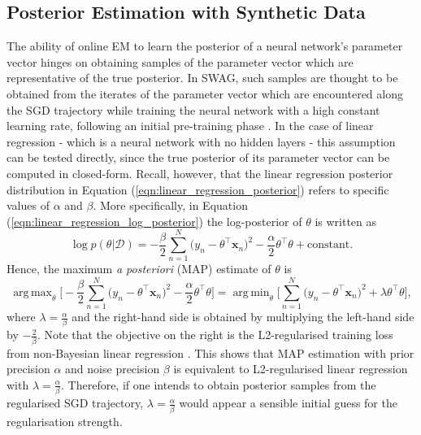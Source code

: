 \documentclass[msc,deptreport.inf]{infthesis} %
\newcommand{\matr}[1]{\mathbf{#1}}
\DeclareMathOperator*{\argmax}{arg\,max}
\DeclareMathOperator*{\argmin}{arg\,min}
\begin{document}
\subsection{Posterior Estimation with Synthetic Data}\label{sec:online_fa_posterior_experiments}

The ability of online EM to learn the posterior of a neural network's parameter vector hinges on obtaining samples of the parameter vector which are representative of the true posterior. In SWAG, such samples are thought to be obtained from the iterates of the parameter vector which are encountered along the SGD trajectory while training the neural network with a high constant learning rate, following an initial pre-training phase \cite{maddox2019}. In the case of linear regression - which is a neural network with no hidden layers - this assumption can be tested directly, since the true posterior of its parameter vector can be computed in closed-form. Recall, however, that the linear regression posterior distribution in Equation (\ref{eqn:linear_regression_posterior}) refers to specific values of $\alpha$ and $\beta$. More specifically, in Equation (\ref{eqn:linear_regression_log_posterior}) the log-posterior of $\theta$ is written as 
\begin{equation}
	\log p(\theta | \mathcal{D}) 
	= -\frac{\beta}{2} \sum_{n=1}^N \big(y_n - \theta^\intercal \matr{x}_n \big)^2 
	-\frac{\alpha}{2} \theta^\intercal \theta 
	+ \text{constant}.
\end{equation}
Hence, the maximum \emph{a posteriori} (MAP) estimate of $\theta$ is 
\begin{equation}
	\argmax_\theta \Big[ -\frac{\beta}{2} \sum_{n=1}^N \big(y_n - \theta^\intercal \matr{x}_n \big)^2 
	-\frac{\alpha}{2} \theta^\intercal \theta \Big]
	= \argmin_\theta \Big[ \sum_{n=1}^N \big(y_n - \theta^\intercal \matr{x}_n \big)^2 
	+ \lambda \theta^\intercal \theta \Big],
\end{equation}
where $\lambda = \frac{\alpha}{\beta}$ and the right-hand side is obtained by multiplying the left-hand side by $-\frac{2}{\beta}$. Note that the objective on the right is the L2-regularised training loss from non-Bayesian linear regression \cite{barber2007}. This shows that MAP estimation with prior precision $\alpha$ and noise precision $\beta$ is equivalent to L2-regularised linear regression with $\lambda = \frac{\alpha}{\beta}$. Therefore, if one intends to obtain posterior samples from the regularised SGD trajectory, $\lambda = \frac{\alpha}{\beta}$ would appear a sensible initial guess for the regularisation strength.
\end{document}
